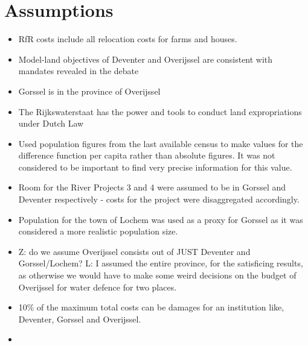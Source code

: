 \section{Assumptions}
\begin{itemize}
    \item RfR costs include all relocation costs for farms and houses.
    \item Model-land objectives of Deventer and Overijssel are consistent with mandates revealed in the debate
    \item Gorssel is in the province of Overijssel
    \item The Rijkswaterstaat has the power and tools to conduct land expropriations under Dutch Law
    \item Used population figures from the last available census to make values for the difference function per capita rather than absolute figures. It was not considered to be important to find very precise information for this value.
    \item Room for the River Projects 3 and 4 were assumed to be in Gorssel and Deventer respectively - costs for the project were disaggregated accordingly.
    \item Population for the town of Lochem was used as a proxy for Gorssel as it was considered a more realistic population size.
    \item Z: do we assume Overijssel consists out of JUST Deventer and Gorssel/Lochem? L: I assumed the entire province, for the satisficing results, as otherwise we would have to make some weird decisions on the budget of Overijssel for water defence for two places.
    \item 10\% of the maximum total costs can be damages for an institution like, Deventer, Gorssel and Overijssel.
    \item 
    
\end{itemize}






